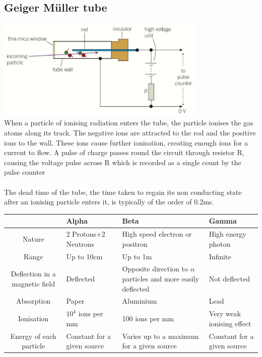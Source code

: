 \documentclass{article}[18pt]
\begin{document}
\subsection{Geiger M\"{u}ller tube}
\includegraphics[width=10cm]{geiger.png}\\
When a particle of ionising radiation enters the tube, the particle ionises the gas atoms along its track. The negative ions are attracted to the rod and the positive ions to the wall. These ions cause further ionisation, creating enough ions for a current to flow. A pulse of charge passes round the circuit through resistor R, causing the voltage pulse across R which is recorded as a single count by the pulse counter\\
\\
The dead time of the tube, the time taken to regain its non conducting state after an ionising particle enters it, is typically of the order of 0.2ms.
\newpage
\begin{tabularx}{\textwidth}{|c|X|X|X|}
\hline
&Alpha&Beta&Gamma\\
\hline
Nature&2 Protons+2 Neutrons&High speed electron or positron&High energy photon\\
\hline
Range&Up to 10cm&Up to 1m&Infinite\\
\hline 
Deflection in a magnetic field&Deflected&Opposite direction to $\alpha$ particles and more easily deflected&Not deflected\\
\hline
Absorption&Paper&Aluminium&Lead \\
\hline
Ionisation&$10^4$ ions per mm&100 ions per mm&Very weak ionising effect\\
\hline
Energy of each particle&Constant for a given source&Varies up to a maximum for a given source&Constant for a given source\\
\hline
\end{tabularx}
   
\end{document}
